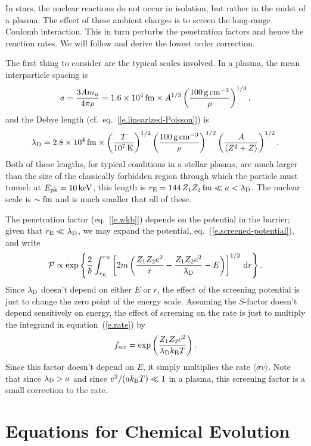 In stars, the nuclear reactions do not occur in isolation, but rather in the midst of a plasma.  The effect of these ambient charges is to screen the long-range Coulomb interaction. This in turn perturbs the penetration factors and hence the reaction rates. We will follow \citet{Salpeter1954Electrons-Scree} and derive the lowest order correction. 

The first thing to consider are the typical scales involved.  In a plasma, the mean interparticle spacing is 
\[ a = \frac{3Am_\mathrm{u}}{4\pi \rho} = 1.6\times 10^{4}\,\mathrm{fm}\times A^{1/3}\left(\frac{100\,\mathrm{g}\,{\mathrm{c}\mathrm{m}}^{-3}}{\rho}\right)^{1/3},
\]
and the Debye length (cf.\ eq.~[\ref{e.linearized-Poisson}]) is 
\[
\lambda_{\mathrm{D}} = 2.8\times 10^{4}\,\mathrm{fm}\times \left(\frac{T}{10^{7}\,\mathrm{K}}\right)^{1/2} \left(\frac{100\,\mathrm{g}\,{\mathrm{c}\mathrm{m}}^{-3}}{\rho}\right)^{1/2} \left(\frac{A}{\langle Z^{2}+Z\rangle}\right)^{1/2}.
\]
Both of these lengths, for typical conditions in a stellar plasma, are much larger than the size of the classically forbidden region through which the particle must tunnel: at $E_{\mathrm{pk}} = 10\,\mathrm{k}\mathrm{eV}$, this length is $r_{\mathrm{E}} = 144\,Z_{1}Z_{2}\,\mathrm{fm} \ll a < \lambda_{\mathrm{D}}$.  The nuclear scale is $\sim\mathrm{fm}$ and is much smaller that all of these.

The penetration factor (eq.~[\ref{e.wkb}]) depends on the potential in the barrier; given that $r_{\mathrm{E}} \ll \lambda_{\mathrm{D}}$, we may expand the potential, eq.~(\ref{e.screened-potential}), and write
\begin{equation}
\mathcal{P} \propto \exp\left\{\frac{2}{\hbar}\int_{r_{\mathrm{E}}}^{r_{\mathrm{N}}}\left[2m\left(\frac{Z_{1}Z_{2}e^{2}}{r} - \frac{Z_{1}Z_{2}e^{2}}{\lambda_{\mathrm{D}}} - E\right) \right]^{1/2}\,\mathrm{d} r\right\}.
\end{equation}
Since $\lambda_{\mathrm{D}}$ doesn't depend on either $E$ or $r$, the effect of the screening potential is just to  change the zero point of the energy scale.  Assuming the $S$-factor doesn't depend sensitively on energy, the effect of screening on the rate is just to multiply the integrand in equation~(\ref{e.rate}) by
\begin{equation}\label{e.fscreening}
  f_{\mathrm{scr}} = \exp\left(\frac{Z_{1}Z_{2}e^{2}}{\lambda_{\mathrm{D}}k_\mathrm{B} T}\right).
\end{equation}
Since this factor doesn't depend on $E$, it simply multiplies the rate $\langle\sigma v\rangle$.  Note that since $\lambda_{\mathrm{D}} > a$ and since $e^{2}/(ak_\mathrm{B} T) \ll 1$ in a plasma, this screening factor is a small correction to the rate.

\section{Equations for Chemical Evolution}\label{e.eqns-for-chem-evol}

